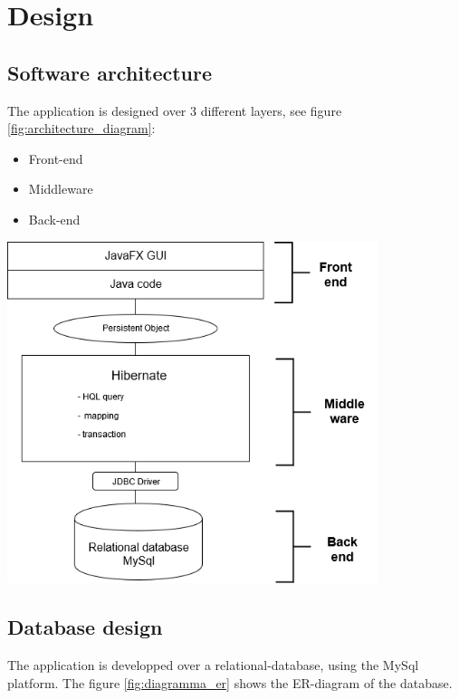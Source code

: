 \documentclass[a4paper, oneside]{article}
\begin{document}
\section{Design}

\subsection{Software architecture}
The application is designed over 3 different layers, see figure \ref{fig:architecture_diagram}:
\begin{itemize}
\item Front-end
\item Middleware
\item Back-end
\end{itemize}
\vspace{5mm}
\begin{minipage}{\linewidth}
\begin{center}
\vspace{1mm}
\includegraphics[height = 100mm]{./images/diagrams/architecture_diagram.png} 
\vspace{6mm}
\label{fig:architecture_diagram}
\end{center}
\end{minipage}
\vspace{5mm}

\clearpage
\subsection{Database design}
The application is developped over a relational-database, using the MySql platform. The figure \ref{fig:diagramma_er} shows the ER-diagram of the database.\\
\end{document}
